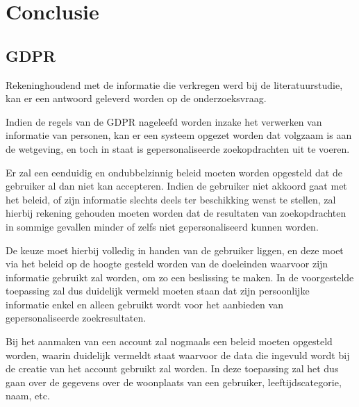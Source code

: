 
\chapter{Conclusie}
\label{ch:conclusie}


\section{GDPR}
\label{sec: Conclusie GDPR}

Rekeninghoudend met de informatie die verkregen werd bij de literatuurstudie, kan er een antwoord geleverd worden op de onderzoeksvraag.

Indien de regels van de GDPR nageleefd worden inzake het verwerken van informatie van personen, kan er een systeem opgezet worden dat volgzaam is aan de wetgeving, en toch in staat is gepersonaliseerde zoekopdrachten uit te voeren. 

Er zal een eenduidig en ondubbelzinnig beleid moeten worden opgesteld dat de gebruiker al dan niet kan accepteren.
 Indien de gebruiker niet akkoord gaat met het beleid, of zijn informatie slechts deels ter beschikking wenst te stellen, zal hierbij rekening gehouden moeten worden dat de resultaten van zoekopdrachten in sommige gevallen minder of zelfs niet gepersonaliseerd kunnen worden.

De keuze moet hierbij volledig in handen van de gebruiker liggen, en deze moet via het beleid op de hoogte gesteld worden van de doeleinden waarvoor zijn informatie gebruikt zal worden, om zo een beslissing te maken. In de voorgestelde toepassing zal dus duidelijk vermeld moeten staan dat zijn persoonlijke informatie enkel en alleen gebruikt wordt voor het aanbieden van gepersonaliseerde zoekresultaten.

Bij het aanmaken van een account zal nogmaals een beleid moeten opgesteld worden, waarin duidelijk vermeldt staat waarvoor de data die ingevuld wordt bij de creatie van het account gebruikt zal worden. In deze toepassing zal het dus gaan over de gegevens over de woonplaats van een gebruiker, leeftijdscategorie, naam, etc.

